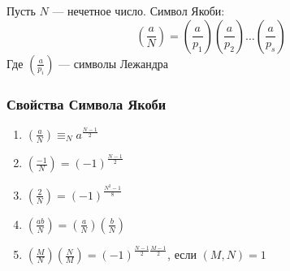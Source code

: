 \begin{definition}
    Пусть \(N\) --- нечетное число. Символ Якоби:
    \[\left(\frac{a}{N}\right) = \left(\frac{a}{p_1}\right)\left(\frac{a}{p_2}\right)\dots\left(\frac{a}{p_s}\right)\]
    Где \(\left(\frac{a}{p_i}\right)\) --- символы Лежандра
\end{definition}

\subsubsection{Свойства Символа Якоби}
\begin{enumerate}
    \item \(\left(\frac{a}{N}\right) \equiv_N a^{\frac{N - 1}{2}}\)
    \item \(\left(\frac{-1}{N}\right) = (-1)^{\frac{N - 1}{2}}\)
    \item \(\left(\frac{2}{N}\right) = (-1)^{\frac{N^2 - 1}{8}}\)
    \item \(\left(\frac{ab}{N}\right) = \left(\frac{a}{N}\right)\left(\frac{b}{N}\right)\)
    \item \(\left(\frac{M}{N}\right)\left(\frac{N}{M}\right) = (-1)^{\frac{N - 1}{2}\frac{M - 1}{2}}\), если \((M, N) = 1\)
\end{enumerate}

